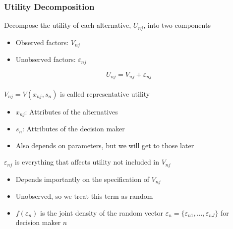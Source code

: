 \documentclass{beamer}
\begin{document}
\begin{frame}\frametitle{Utility Decomposition}
	Decompose the utility of each alternative, $U_{nj}$, into two components
	\begin{itemize}
		\item Observed factors: $V_{nj}$
		\item Unobserved factors: $\varepsilon_{nj}$
	\end{itemize}
	$$U_{nj} = V_{nj} + \varepsilon_{nj}$$ \\
	\vspace{2ex}
	$V_{nj} = V(x_{nj}, s_n)$ is called representative utility
	\begin{itemize}
		\item $x_{nj}$: Attributes of the alternatives
		\item $s_n$: Attributes of the decision maker
		\item Also depends on parameters, but we will get to those later
	\end{itemize}
	\vspace{2ex}
	$\varepsilon_{nj}$ is everything that affects utility not included in $V_{nj}$
	\begin{itemize}
		\item Depends importantly on the specification of $V_{nj}$
		\item Unobserved, so we treat this term as random
		\item $f(\varepsilon_n)$ is the joint density of the random vector $\varepsilon_n = \{\varepsilon_{n1}, \dots, \varepsilon_{nJ}\}$ for decision maker $n$
	\end{itemize}
\end{frame}
\end{document}
